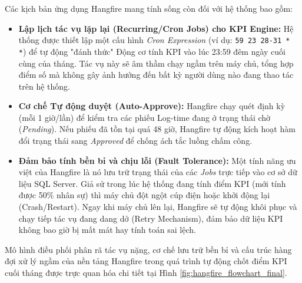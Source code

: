 \documentclass[a4paper,13.5pt]{extreport}
\begin{document}
Các kịch bản ứng dụng Hangfire mang tính sống còn đối với hệ thống bao gồm:
\begin{itemize}
    \item \textbf{Lập lịch tác vụ lặp lại (Recurring/Cron Jobs) cho KPI Engine:} Hệ thống được thiết lập một cấu hình \textit{Cron Expression} (ví dụ: \texttt{59 23 28-31 * *}) để tự động "đánh thức" Động cơ tính KPI vào lúc 23:59 đêm ngày cuối cùng của tháng. Tác vụ này sẽ âm thầm chạy ngầm trên máy chủ, tổng hợp điểm số mà không gây ảnh hưởng đến bất kỳ người dùng nào đang thao tác trên hệ thống.
    \item \textbf{Cơ chế Tự động duyệt (Auto-Approve):} Hangfire chạy quét định kỳ (mỗi 1 giờ/lần) để kiểm tra các phiếu Log-time đang ở trạng thái chờ (\textit{Pending}). Nếu phiếu đã tồn tại quá 48 giờ, Hangfire tự động kích hoạt hàm đổi trạng thái sang \textit{Approved} để chống ách tắc luồng chấm công.
    \item \textbf{Đảm bảo tính bền bỉ và chịu lỗi (Fault Tolerance):} Một tính năng ưu việt của Hangfire là nó lưu trữ trạng thái của các \textit{Jobs} trực tiếp vào cơ sở dữ liệu SQL Server. Giả sử trong lúc hệ thống đang tính điểm KPI (mới tính được 50\% nhân sự) thì máy chủ đột ngột cúp điện hoặc khởi động lại (Crash/Restart). Ngay khi máy chủ lên lại, Hangfire sẽ tự động khôi phục và chạy tiếp tác vụ đang dang dở (Retry Mechanism), đảm bảo dữ liệu KPI không bao giờ bị mất mát hay tính toán sai lệch.
\end{itemize}

Mô hình điều phối phân rã tác vụ nặng, cơ chế lưu trữ bền bỉ và cấu trúc hàng đợi xử lý ngầm của nền tảng Hangfire trong quá trình tự động chốt điểm KPI cuối tháng được trực quan hóa chi tiết tại Hình \ref{fig:hangfire_flowchart_final}.
\end{document}
